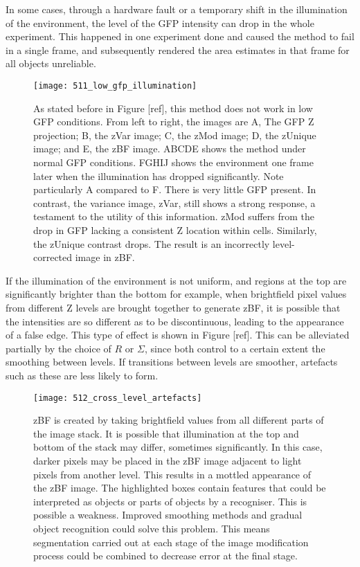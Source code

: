 In some cases, through a hardware fault or a temporary shift in the illumination of the environment, the level of the GFP intensity can drop in the whole experiment. This happened in one experiment done and caused the method to fail in a single frame, and subsequently rendered the area estimates in that frame for all objects unreliable.

\begin{figure}[h!]
 \centering
 \texttt{[image: 511\_low\_gfp\_illumination]}
 \caption[Effects of low GFP illumination]{
 	As stated before in Figure [ref], this method does not work in low GFP conditions. From left to right, the images are A, The GFP Z projection; B, the zVar image; C, the zMod image; D, the zUnique image; and E, the zBF image. ABCDE shows the method under normal GFP conditions. FGHIJ shows the environment one frame later when the illumination has dropped significantly. Note particularly A compared to F. There is very little GFP present. In contrast, the variance image, zVar, still shows a strong response, a testament to the utility of this information. zMod suffers from the drop in GFP lacking a consistent Z location within cells. Similarly, the zUnique contrast drops. The result is an incorrectly level-corrected image in zBF.
 }
 \label{fig:lowgfpillumination}
\end{figure}

If the illumination of the environment is not uniform, and regions at the top are significantly brighter than the bottom for example, when brightfield pixel values from different Z levels are brought together to generate zBF, it is possible that the intensities are so different as to be discontinuous, leading to the appearance of a false edge. This type of effect is shown in Figure [ref]. This can be alleviated partially by the choice of $R$ or $\Sigma$, since both control to a certain extent the smoothing between levels. If transitions between levels are smoother, artefacts such as these are less likely to form.

\begin{figure}[h!]
 \centering
 \texttt{[image: 512\_cross\_level\_artefacts]}
 \caption[Cross-level artefacts]{
 	zBF is created by taking brightfield values from all different parts of the image stack. It is possible that illumination at the top and bottom of the stack may differ, sometimes significantly. In this case, darker pixels may be placed in the zBF image adjacent to light pixels from another level. This results in a mottled appearance of the zBF image. The highlighted boxes contain features that could be interpreted as objects or parts of objects by a recogniser. This is possible a weakness. Improved smoothing methods and gradual object recognition could solve this problem. This means segmentation carried out at each stage of the image modification process could be combined to decrease error at the final stage.
 }
 \label{fig:crosslevelartefacts}
\end{figure}


